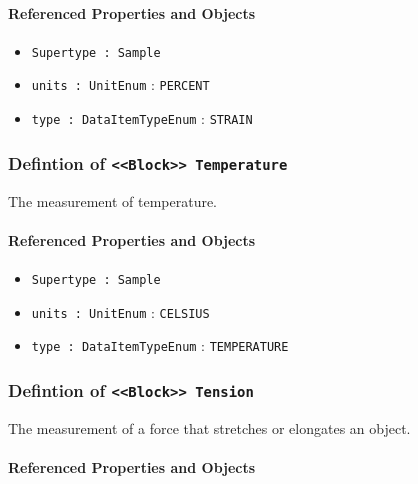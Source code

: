 \FloatBarrier
\paragraph{Referenced Properties and Objects}

\begin{itemize}
\item \texttt{Supertype : Sample}

\item \texttt{units : UnitEnum} : \texttt{PERCENT}

\item \texttt{type : DataItemTypeEnum} : \texttt{STRAIN}

\end{itemize}
\FloatBarrier
\subsubsection{Defintion of \texttt{<<Block>> Temperature}}
  \label{type:Temperature}

\FloatBarrier

The measurement of temperature.

\FloatBarrier
\paragraph{Referenced Properties and Objects}

\begin{itemize}
\item \texttt{Supertype : Sample}

\item \texttt{units : UnitEnum} : \texttt{CELSIUS}

\item \texttt{type : DataItemTypeEnum} : \texttt{TEMPERATURE}

\end{itemize}
\FloatBarrier
\subsubsection{Defintion of \texttt{<<Block>> Tension}}
  \label{type:Tension}

\FloatBarrier

The measurement of a force that stretches or elongates an object.

\FloatBarrier
\paragraph{Referenced Properties and Objects}

